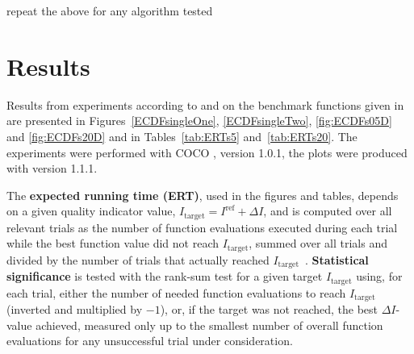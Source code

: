 \documentclass{sig-alternate}
\newcommand{\DI}{\ensuremath{\Delta I}}
\newcommand{\Itarget}{\ensuremath{I_\mathrm{target}}}
\newcommand{\change}[1]{{\color{red} #1}}
\newcommand{\hvref}{I^{\mathrm{ref}}}
\begin{document}
\change{repeat the above for any algorithm tested}


\section{Results}

Results from experiments according to \cite{hansen2016exp} and \cite{hansen2016perfass} on the
benchmark functions given in \cite{wp200901_2010,hansen2012fun} are
presented in Figures~\ref{ECDFsingleOne}, \ref{ECDFsingleTwo}, \ref{fig:ECDFs05D} and
\ref{fig:ECDFs20D} and in Tables~\ref{tab:ERTs5} and~\ref{tab:ERTs20}.
The experiments were performed with COCO \cite{hansen2016cocoplat}, version
\change{1.0.1}, the plots were produced with version \change{1.1.1}.

The \textbf{expected running time (ERT)}, used in the figures and tables,
depends on a given quality indicator value, $\Itarget=\hvref+\DI$, and is
computed over all relevant trials as the number of function
evaluations executed during each trial while the best function value
did not reach \Itarget, summed over all trials and divided by the
number of trials that actually reached \Itarget\
\cite{hansen2016exp,price1997dev}.  \textbf{Statistical significance}
is tested with the rank-sum test for a given target $\Itarget$
using, for each trial,
either the number of needed function evaluations to reach
$\Itarget$ (inverted and multiplied by $-1$), or, if the target
was not reached, the best $\DI$-value achieved, measured only up to
the smallest number of overall function evaluations for any
unsuccessful trial under consideration.




\end{document}
